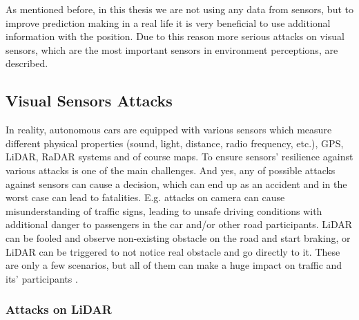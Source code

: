 As mentioned before, in this thesis we are not using any data from sensors, but to improve prediction making in a real life it is very beneficial to use additional information with the position. Due to this reason more serious attacks on visual sensors, which are the most important sensors in environment perceptions, are described. 

\subsection{Visual Sensors Attacks}
 
 In reality, autonomous cars are equipped with various sensors which measure different physical properties (sound, light, distance, radio frequency, etc.), \gls{GPS}, \gls{LiDAR}, \gls{RaDAR} systems and of course maps. To ensure sensors' resilience against various attacks is one of the main challenges. And yes, any of possible attacks against sensors can cause a decision, which can end up as an accident and in the worst case can lead to fatalities. E.g. attacks on camera can cause misunderstanding of traffic signs, leading to unsafe driving conditions with additional danger to passengers in the car and/or other road participants. \gls{LiDAR} can be fooled and observe non-existing obstacle on the road and start braking, or \gls{LiDAR} can be triggered to not notice real obstacle and go directly to it. These are only a few scenarios, but all of them can make a huge impact on traffic and its' participants \cite{AttackModel}. \\

\subsubsection{Attacks on \gls{LiDAR}}

